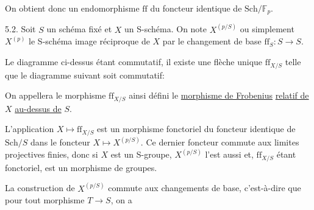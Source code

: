 
On obtient donc un endomorphisme $\mathrm{ff}$ du foncteur identique de $\mathrm{Sch}/\mathbb{F}_p$.

5.2. Soit $S$ un schéma fixé et $X$ un S-schéma. On note $X^{(p/S)}$
ou simplement $X^{(p)}$ le S-schéma image réciproque de $X$ par le changement
de base $\mathrm{ff}_S : S \to S$.

Le diagramme ci-dessus étant commutatif, il existe une flèche
unique $\mathrm{ff}_{X/S}$ telle que le diagramme suivant soit commutatif:


On appellera le morphisme $\mathrm{ff}_{X/S}$ ainsi défini le \uline{morphisme de Frobenius}
\uline{relatif de} $X$ \uline{au-dessus de} $S$.

L'application $X \mapsto \mathrm{ff}_{X/S}$ est un morphisme fonctoriel du foncteur
identique de $\mathrm{Sch}/S$ dans le foncteur $X \mapsto X^{(p/S)}$. Ce dernier foncteur
commute aux limites projectives finies, donc si $X$ est un S-groupe,
$X^{(p/S)}$ l'est aussi et, $\mathrm{ff}_{X/S}$ étant fonctoriel, est un morphisme de groupes.

La construction de $X^{(p/S)}$ commute aux changements de base,
c'est-à-dire que pour tout morphisme $T \to S$, on a

